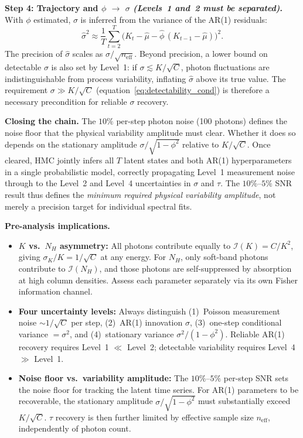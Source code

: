 \documentclass[11pt, a4paper]{article}
\begin{document}
\medskip
\noindent\textbf{Step 4: Trajectory and $\phi$ $\to$ $\sigma$
\emph{(Levels~1 and~2 must be separated)}.}
With $\phi$ estimated, $\sigma$ is inferred from the variance of the AR(1) residuals:
\begin{equation}
    \hat\sigma^2 \approx \frac{1}{T}\sum_{t=2}^{T}
    \bigl(K_t - \hat\mu - \hat\phi\,(K_{t-1} - \hat\mu)\bigr)^2.
\end{equation}
The precision of $\hat\sigma$ scales as $\sigma/\sqrt{n_\mathrm{eff}}$.
Beyond precision, a lower bound on detectable $\sigma$ is also set by Level~1:
if $\sigma \lesssim K/\sqrt{C}$, photon fluctuations are indistinguishable from
process variability, inflating $\hat\sigma$ above its true value.
The requirement $\sigma \gg K/\sqrt{C}$ (equation~\eqref{eq:detectability_cond}) is
therefore a necessary precondition for reliable $\sigma$ recovery.

\medskip
\noindent\textbf{Closing the chain.}
The $10\%$ per-step photon noise (100 photons) defines the noise floor that the
physical variability amplitude must clear.
Whether it does so depends on the stationary amplitude $\sigma/\sqrt{1-\phi^2}$
relative to $K/\sqrt{C}$.
Once cleared, HMC jointly infers all $T$ latent states and both AR(1) hyperparameters
in a single probabilistic model, correctly propagating Level~1 measurement noise
through to the Level~2 and Level~4 uncertainties in $\sigma$ and $\tau$.
The $10\%$--$5\%$ SNR result thus defines the \emph{minimum required physical
variability amplitude}, not merely a precision target for individual spectral fits.

\begin{keybox}
\textbf{Pre-analysis implications.}

\smallskip
\begin{itemize}[noitemsep]
    \item \textbf{$K$ vs.\ $N_H$ asymmetry:}
    All photons contribute equally to $\mathcal{I}(K) = C/K^2$, giving
    $\sigma_K/K = 1/\sqrt{C}$ at any energy.
    For $N_H$, only soft-band photons contribute to $\mathcal{I}(N_H)$, and those
    photons are self-suppressed by absorption at high column densities.
    Assess each parameter separately via its own Fisher information channel.

    \item \textbf{Four uncertainty levels:}
    Always distinguish (1)~Poisson measurement noise $\sim 1/\sqrt{C}$ per step,
    (2)~AR(1) innovation $\sigma$, (3)~one-step conditional variance $= \sigma^2$,
    and (4)~stationary variance $\sigma^2/(1-\phi^2)$.
    Reliable AR(1) recovery requires Level~1 $\ll$ Level~2; detectable variability
    requires Level~4 $\gg$ Level~1.

    \item \textbf{Noise floor vs.\ variability amplitude:}
    The $10\%$--$5\%$ per-step SNR sets the noise floor for tracking the latent
    time series.
    For AR(1) parameters to be recoverable, the stationary amplitude
    $\sigma/\sqrt{1-\phi^2}$ must substantially exceed $K/\sqrt{C}$.
    $\tau$ recovery is then further limited by effective sample size $n_\mathrm{eff}$,
    independently of photon count.
\end{itemize}
\end{keybox}
\end{document}

